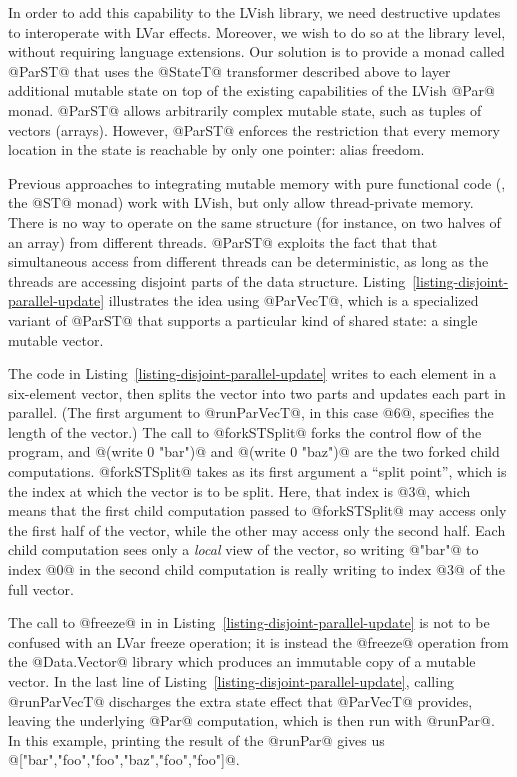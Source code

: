 In order to add this capability to the LVish library, we need
destructive updates to interoperate with LVar effects.  Moreover, we
wish to do so at the library level, without requiring language
extensions.  Our solution is to provide a monad called @ParST@ that
uses the @StateT@ transformer described above to layer additional
mutable state on top of the existing capabilities of the LVish @Par@
monad.  @ParST@ allows arbitrarily complex mutable state, such as
tuples of vectors (arrays).  However, @ParST@ enforces the restriction
that every memory location in the state is reachable by only one
pointer: alias freedom.

Previous approaches to integrating mutable memory with pure functional
code (\ie, the @ST@ monad) work with LVish, but only allow
thread-private memory.  There is no way to operate on the same
structure (for instance, on two halves of an array) from different
threads.  @ParST@ exploits the fact that that simultaneous access from
different threads can be deterministic, as long as the threads are
accessing disjoint parts of the data structure.
Listing~\ref{listing-disjoint-parallel-update} illustrates the idea
using @ParVecT@, which is a specialized variant of @ParST@ that
supports a particular kind of shared state: a single mutable vector.

\singlespacing 
\doublespacing

The code in Listing~\ref{listing-disjoint-parallel-update} writes to
each element in a six-element vector, then splits the vector into two
parts and updates each part in parallel.  (The first argument to
@runParVecT@, in this case @6@, specifies the length of the vector.)
The call to @forkSTSplit@ forks the control flow of the program, and
@(write 0 "bar")@ and @(write 0 "baz")@ are the two forked child
computations.  @forkSTSplit@ takes as its first argument a ``split
point'', which is the index at which the vector is to be split.  Here,
that index is @3@, which means that the first child computation passed
to @forkSTSplit@ may access only the first half of the vector, while
the other may access only the second half.  Each child computation
sees only a \emph{local} view of the vector, so writing @"bar"@ to
index @0@ in the second child computation is really writing to index
@3@ of the full vector.

The call to @freeze@ in in
Listing~\ref{listing-disjoint-parallel-update} is not to be confused
with an LVar freeze operation; it is instead the @freeze@ operation
from the @Data.Vector@ library which produces an immutable copy of a
mutable vector.  In the last line of
Listing~\ref{listing-disjoint-parallel-update}, calling @runParVecT@
discharges the extra state effect that @ParVecT@ provides, leaving the
underlying @Par@ computation, which is then run with @runPar@.  In
this example, printing the result of the @runPar@ gives us
@["bar","foo","foo","baz","foo","foo"]@.

